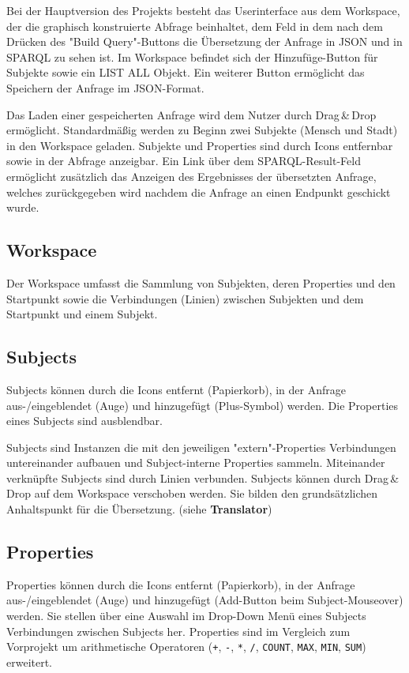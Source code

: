Bei der Hauptversion des Projekts besteht das Userinterface aus dem
Workspace, der die graphisch konstruierte Abfrage beinhaltet, dem Feld
in dem nach dem Drücken des "Build Query"-Buttons die Übersetzung der
Anfrage in JSON und in SPARQL zu sehen ist.
Im Workspace befindet sich der Hinzufüge-Button für Subjekte sowie ein LIST ALL Objekt.
Ein weiterer Button ermöglicht das Speichern der Anfrage im
JSON-Format.

Das Laden einer gespeicherten Anfrage wird dem Nutzer durch
Drag\,\&\,Drop ermöglicht.
Standardmäßig werden zu Beginn zwei Subjekte (Mensch und Stadt) in den
Workspace geladen.
Subjekte und Properties sind durch Icons entfernbar sowie in der Abfrage anzeigbar.
Ein Link über dem SPARQL-Result-Feld ermöglicht zusätzlich das Anzeigen des Ergebnisses der übersetzten Anfrage, welches zurückgegeben wird nachdem die Anfrage an einen Endpunkt geschickt wurde.

\subsection*{Workspace}

Der Workspace umfasst die Sammlung von Subjekten, deren Properties und den Startpunkt sowie die Verbindungen (Linien) zwischen Subjekten und dem Startpunkt und einem Subjekt.

\subsection*{Subjects}

Subjects können durch die Icons entfernt (Papierkorb), in der Anfrage
aus-/eingeblendet (Auge) und hinzugefügt (Plus-Symbol) werden. Die
Properties eines Subjects sind ausblendbar.

Subjects sind Instanzen die mit den jeweiligen "extern"-Properties
Verbindungen untereinander aufbauen und Subject-interne Properties
sammeln. Miteinander verknüpfte Subjects sind durch Linien
verbunden. Subjects können durch Drag\,\&\,Drop auf dem Workspace
verschoben werden. Sie bilden den grundsätzlichen Anhaltspunkt für die
Übersetzung. (siehe {\sffamily\bfseries Translator})

\subsection*{Properties}

\Hack{\enlargethispage{1.5\baselineskip}}
Properties können durch die Icons entfernt (Papierkorb), in der Anfrage aus-/eingeblendet (Auge) und hinzugefügt (Add-Button beim Subject-Mouseover) werden.
Sie stellen über eine Auswahl im Drop-Down Menü eines Subjects Verbindungen zwischen Subjects her. Properties sind im Vergleich zum Vorprojekt um arithmetische Operatoren (\verb-+-, \verb+-+, \verb+*+, \verb+/+, \verb+COUNT+, \verb+MAX+, \verb+MIN+, \verb+SUM+) erweitert.

